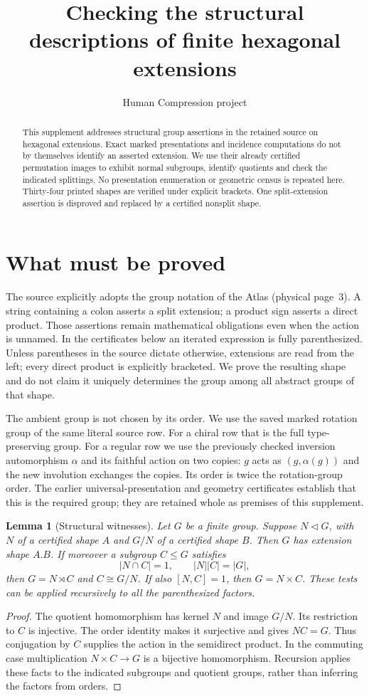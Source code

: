 \documentclass[11pt,a4paper]{article}
\title{Checking the structural descriptions of finite hexagonal extensions}
\author{Human Compression project}\date{}
\newtheorem{lemma}{Lemma}
\begin{document}
\maketitle
\begin{abstract}
This supplement addresses structural group assertions in the retained
source on hexagonal extensions. Exact marked presentations and
incidence computations do not by themselves identify an asserted extension.
We use their already certified permutation images to exhibit normal
subgroups, identify quotients and check the indicated splittings. No
presentation enumeration or geometric census is repeated here. Thirty-four printed shapes are verified under explicit brackets. One
split-extension assertion is disproved and replaced by a certified
nonsplit shape.
\end{abstract}
\section{What must be proved}
The source explicitly adopts the group notation of the Atlas (physical
page~3). A string containing a colon asserts a split extension; a product
sign asserts a direct product. Those assertions remain mathematical
obligations even when the action is unnamed. In the certificates below an
iterated expression is fully parenthesized. Unless parentheses in the
source dictate otherwise, extensions are read from the left; every direct
product is explicitly bracketed. We prove the resulting shape and do not
claim it uniquely determines the group among all abstract groups of that
shape.

The ambient group is not chosen by its order. We use the saved marked
rotation group of the same literal source row. For a chiral row that is
the full type-preserving group. For a regular row we use the previously
checked inversion automorphism $\alpha$ and its faithful action on two
copies: $g$ acts as $(g,\alpha(g))$ and the new involution exchanges the
copies. Its order is twice the rotation-group order. The earlier
universal-presentation and geometry certificates establish that this is
the required group; they are retained whole as premises of this
supplement.

\begin{lemma}[Structural witnesses]\label{certificate}
Let $G$ be a finite group. Suppose $N\lhd G$, with $N$ of a certified
shape $A$ and $G/N$ of a certified shape $B$. Then $G$ has extension
shape $A.B$. If moreover a subgroup $C\leq G$ satisfies
\[
 |N\cap C|=1,\qquad |N||C|=|G|,
\]
then $G=N\rtimes C$ and $C\cong G/N$. If also $[N,C]=1$, then
$G=N\times C$. These tests can be applied recursively to all the
parenthesized factors.
\end{lemma}
\begin{proof}
The quotient homomorphism has kernel $N$ and image $G/N$. Its restriction
to $C$ is injective. The order identity makes it surjective and gives
$NC=G$. Thus conjugation by $C$ supplies the action in the semidirect
product. In the commuting case multiplication $N\times C\to G$ is a
bijective homomorphism. Recursion applies these facts to the indicated
subgroups and quotient groups, rather than inferring the factors from
orders.
\end{proof}
\end{document}
